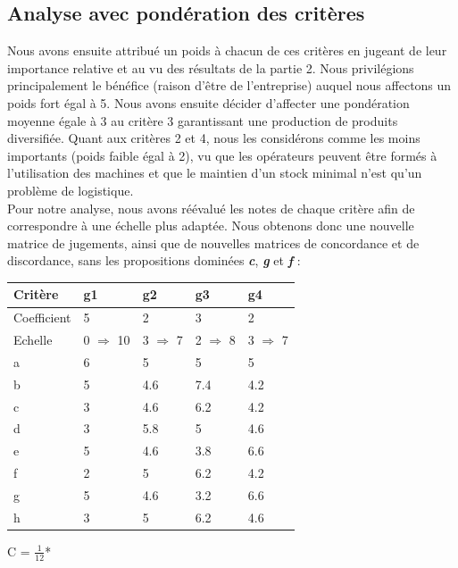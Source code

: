 \documentclass[12pt]{article}
\begin{document}
\subsection{Analyse avec pondération des critères} 
Nous avons ensuite attribué un poids à chacun de ces critères en jugeant de leur importance relative et au vu des résultats de la partie 2. Nous privilégions principalement le bénéfice (raison d'être de l'entreprise) auquel nous affectons un poids fort égal à 5. Nous avons ensuite décider d'affecter une pondération moyenne égale à 3 au critère 3 garantissant une production de produits diversifiée. Quant aux critères 2 et 4, nous les considérons comme les moins importants (poids faible égal à 2), vu que les opérateurs peuvent être formés à l'utilisation des machines et que le maintien d'un stock minimal n'est qu'un problème de logistique.\\
Pour notre analyse, nous avons réévalué les notes de chaque critère afin de correspondre à une échelle plus adaptée. Nous obtenons donc une nouvelle matrice de jugements, ainsi que de nouvelles matrices de concordance et de discordance, sans les propositions dominées \textbf{\emph{c}}, \textbf{\emph{g}} et \textbf{\emph{f}} :
\begin{center}
\renewcommand{\arraystretch}{1.2}
\begin{tabular}{|L|M|M|M|M|}
\hline 
Critère & g1 & g2 & g3 & g4 \\\hline  
Coefficient & 5 & 2 & 3 & 2 \\ \hline 
Echelle & 0 $ \Rightarrow $ 10 & 3 $ \Rightarrow $ 7 & 2 $ \Rightarrow $ 8 & 3 $ \Rightarrow $ 7 \\ \hline 
a & 6 & 5 & 5 & 5 \\ \hline 
b & 5 & 4.6 & 7.4 & 4.2 \\ \hline 
c & 3 & 4.6 & 6.2 & 4.2 \\ \hline 
d & 3 & 5.8 & 5 & 4.6 \\ \hline 
e & 5 & 4.6 & 3.8 & 6.6 \\ \hline 
f & 2 & 5 & 6.2 & 4.2 \\ \hline 
g & 5 & 4.6 & 3.2 & 6.6 \\ \hline 
h & 3 & 5 & 6.2 & 4.6 \\ 
\hline 
\end{tabular} 
\end{center}
\begin{minipage}{0.45\textwidth}
C = $\frac{1}{12}$*
\end{minipage}
\end{document}
